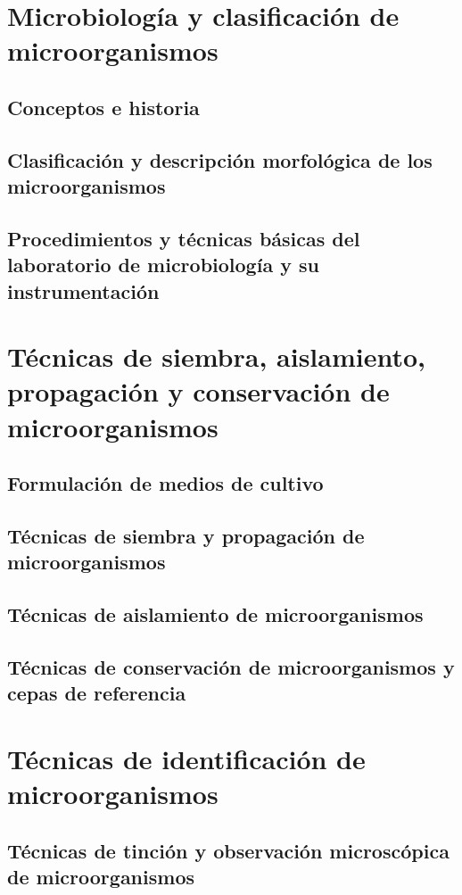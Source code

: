 \documentclass{../summarie}
\begin{document}
\Portada
\Indice
\fancystyle
\onehalfspacing


\part{Microbiología y clasificación de microorganismos}
    \chapter{Conceptos e historia}
    \chapter{Clasificación y descripción morfológica de los microorganismos}
    \chapter{Procedimientos y técnicas básicas del laboratorio de microbiología y su instrumentación}

\part{Técnicas de siembra, aislamiento, propagación y conservación de microorganismos}
    \chapter{Formulación de medios de cultivo}
    \chapter{Técnicas de siembra y propagación de microorganismos}
    \chapter{Técnicas de aislamiento de microorganismos}
    \chapter{Técnicas de conservación de microorganismos y cepas de referencia}

\part{Técnicas de identificación de microorganismos}
    \chapter{Técnicas de tinción y observación microscópica de microorganismos}
\end{document}
